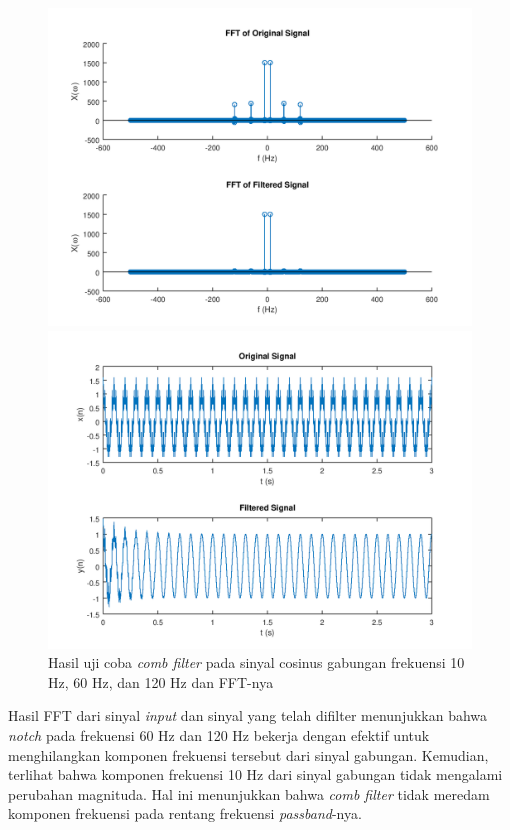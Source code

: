 \documentclass[11pt]{article}
\begin{document}
\begin{figure}[H]
\centerline{\includegraphics[scale=0.55]{figures/fig20-combcosspectrum.png}}
\centerline{\includegraphics[scale=0.55]{figures/fig19-combcostrial.png}}
\caption{Hasil uji coba \textit{comb filter} pada sinyal cosinus gabungan frekuensi 10 Hz, 60 Hz, dan 120 Hz dan FFT-nya}
\label{combcosresp}
\end{figure}

Hasil FFT dari sinyal \textit{input} dan sinyal yang telah difilter menunjukkan bahwa \textit{notch} pada frekuensi 60 Hz dan 120 Hz bekerja dengan efektif untuk menghilangkan komponen frekuensi tersebut dari sinyal gabungan. Kemudian, terlihat bahwa komponen frekuensi 10 Hz dari sinyal gabungan tidak mengalami perubahan magnituda. Hal ini menunjukkan bahwa \textit{comb filter} tidak meredam komponen frekuensi pada rentang frekuensi \textit{passband}-nya.
\end{document}
